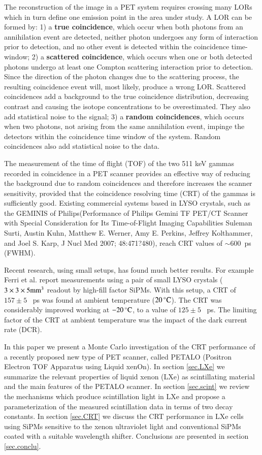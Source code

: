 \documentclass[review]{elsarticle}
\begin{document}
The reconstruction of the image in a PET system requires crossing many LORs which in turn define one emission point in the area under study. A LOR can be formed by: 1) a {\bf true coincidence}, which occur when both photons from an annihilation event are detected, neither photon undergoes any form of interaction prior to detection, and no other event is detected within the coincidence time-window; 2)
a {\bf scattered coincidence}, which occurs when one or both detected photons undergo at least one Compton scattering interaction prior to detection. Since the direction of the photon changes due to the scattering process, the resulting coincidence event will, most likely, produce a wrong LOR. Scattered coincidences add a background to the true coincidence distribution, decreasing contrast and causing the isotope concentrations to be overestimated. They also add statistical noise to the signal; 3)  a {\bf random coincidences}, which occurs when two photons, not arising from the same annihilation event, impinge the detectors within the coincidence time window of the system. Random coincidences also add statistical noise to the data. 

The measurement of the time of flight (TOF) of the two 511 keV gammas recorded in coincidence in a PET scanner provides an effective way of reducing the background due to random coincidences and therefore increases the scanner sensitivity, provided that the coincidence resolving time (CRT) of the gammas is sufficiently good. Existing commercial systems based in LYSO crystals, such as the GEMINIS of Philips(Performance of Philips Gemini TF PET/CT Scanner with Special Consideration for Its Time-of-Flight Imaging Capabilities
Suleman Surti, Austin Kuhn, Matthew E. Werner, Amy E. Perkins, Jeffrey Kolthammer, and Joel S. Karp, J Nucl Med 2007; 48:471?480), reach CRT values of 
$\sim 600$~ps (FWHM). 

Recent research, using small setups, has found much better results. For example Ferri et al. \cite{LysoFBK} report measurements using a pair of small LYSO crystals 
($3 \times 3 \times 5 {\rm mm^3}$ readout by high-fill factor SiPMs. With this setup, a CRT of $157\pm 5$~ ps was found at ambient temperature ($20\,^{\circ}{\rm C}$). The CRT was considerably improved working at $-20\,^{\circ}{\rm C}$, to a value of
 $125\pm 5$~ ps. The limiting factor of the CRT at ambient temperature was the impact of the dark current rate (DCR).

In this paper we present a Monte Carlo investigation of the CRT performance of a recently proposed new type of
PET scanner, called PETALO (Positron Electron TOF Apparatus using Liquid xenOn). 
 In section \ref{sec.LXe} we summarize the relevant properties of liquid xenon (LXe) as scintillating material and the main features of the PETALO scanner. In section \ref{sec.scint} we review the mechanisms which produce scintillation light in LXe and propose a parameterization of the measured scintillation data in terms of two decay constants. In section \ref{sec.CRT} we discuss the CRT performance in LXe cells using SiPMs sensitive to the xenon ultraviolet  light and conventional SiPMs coated with a suitable wavelength shifter. Conclusions are presented in section \ref{sec.conclu}. 
\end{document}
